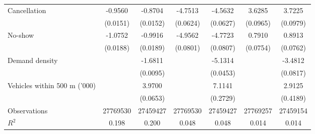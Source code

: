 \documentclass[reviewmode]{restat}
\begin{document}
\begin{table}[]
{\begin{minipage}{18cm}
{\begin{tabularx}{\textwidth}{l@{\extracolsep{\fill}}*{6}{c}}
		\midrule
		Cancellation        &     -0.9560\sym{***}&     -0.8704\sym{***}&     -4.7513\sym{***}&     -4.5632\sym{***}&      3.6285\sym{***}&      3.7225\sym{***}\\
		                    &    (0.0151)         &    (0.0152)         &    (0.0624)         &    (0.0627)         &    (0.0965)         &    (0.0979)         \\
		\addlinespace
		No-show             &     -1.0752\sym{***}&     -0.9916\sym{***}&     -4.9562\sym{***}&     -4.7723\sym{***}&      0.7910\sym{***}&      0.8913\sym{***}\\
		                    &    (0.0188)         &    (0.0189)         &    (0.0801)         &    (0.0807)         &    (0.0754)         &    (0.0762)         \\
		\addlinespace
		Demand density      &                     &     -1.6811\sym{***}&                     &     -5.1314\sym{***}&                     &     -3.4812\sym{***}\\
		                    &                     &    (0.0095)         &                     &    (0.0453)         &                     &    (0.0817)         \\
		\addlinespace
		Vehicles within 500 m ('000)&                     &      3.9700\sym{***}&                     &      7.1141\sym{***}&                     &      2.9125\sym{***}\\
		                    &                     &    (0.0653)         &                     &    (0.2729)         &                     &    (0.4189)         \\
		\midrule
		Observations        &\num{27769530}         &\num{27459427}         &\num{27769530}         &\num{27459427}         &\num{27769257}         &\num{27459154}         \\
		\(R^2\)             &     {0.198}         &     {0.200}         &     {0.048}         &     {0.048}         &     {0.014}         &     {0.014}         \\

\end{tabularx}}
\end{minipage}}
\end{table}
\end{document}
